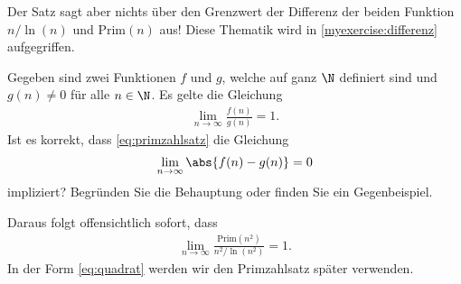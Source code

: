 	Der Satz sagt aber nichts über den Grenzwert der Differenz der beiden Funktion $n/\ln (n)$ und $\text{Prim}(n)$ aus! Diese Thematik wird in \cref{myexercise:differenz} aufgegriffen.

	\begin{myexercise}\label{myexercise:differenz}
		Gegeben sind zwei Funktionen $f$ und $g$, welche auf ganz $\N$ definiert sind und $g(n) \neq 0$ für alle $n\in\N$. Es gelte die Gleichung
		\begin{align*}
			\lim_{n\to\infty}\frac{f(n)}{g(n)} = 1.
		\end{align*}
		Ist es korrekt, dass \cref{eq:primzahlsatz} die Gleichung
		\begin{align*}
			\lim_{n\to\infty} \abs{f(n) - g(n)} = 0
		\end{align*}
		impliziert? Begründen Sie die Behauptung oder finden Sie ein Gegenbeispiel.
	\end{myexercise}

	Daraus folgt offensichtlich sofort, dass
	\begin{align}\label{eq:quadrat}
		\lim_{n\to\infty} \frac{\text{Prim}(n^2)}{n^2/\ln (n^2)} = 1.
	\end{align}
	In der Form \ref{eq:quadrat} werden wir den Primzahlsatz später verwenden.


